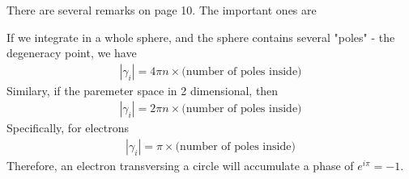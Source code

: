         There are several remarks on page 10. The important ones are
        \begin{remark}
            If we integrate in a whole sphere, and the sphere contains
            several "poles" - the degeneracy point, we have
            \begin{align}
                |\gamma_i| = 4\pi n \times \text{(number of poles
                inside)}
            \end{align}
            Similary, if the paremeter space in 2 dimensional, then
            \begin{align}
                |\gamma_i| = 2\pi n \times \text{(number of poles
                inside)}
            \end{align}
            Specifically, for electrons
            \begin{align}
                |\gamma_i| = \pi \times \text{(number of poles
                inside)}
            \end{align}
            Therefore, an electron transversing a circle will
            accumulate a phase of $e^{i\pi}=-1$.
        \end{remark}
